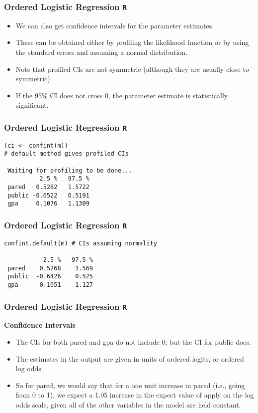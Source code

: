 \documentclass[00-GLMregslides.tex]{subfiles}
\begin{document}
	
\begin{frame}
	\frametitle{Ordered Logistic Regression \texttt{R} }
	\Large
	\begin{itemize}
\item We can also get confidence intervals for the parameter estimates. 
\item These can be obtained either by profiling the likelihood function or by using the standard errors and assuming a normal distribution.
\item Note that profiled CIs are not symmetric (although they are usually close to symmetric). 
\item If the 95\% CI does not cross 0, the parameter estimate is statistically significant.
\end{itemize}
\end{frame}
\begin{frame}[fragile]
		\frametitle{Ordered Logistic Regression \texttt{R} }
		\Large
	\begin{verbatim}
(ci <- confint(m)) 
# default method gives profiled CIs

 Waiting for profiling to be done...
          2.5 %   97.5 %
 pared   0.5282   1.5722
 public -0.6522   0.5191
 gpa     0.1076   1.1309
\end{verbatim}
\end{frame}
\begin{frame}[fragile]
\frametitle{Ordered Logistic Regression \texttt{R} }
\Large
\begin{verbatim}
confint.default(m) # CIs assuming normality

           2.5 %   97.5 %
 pared    0.5268    1.569
 public  -0.6426    0.525
 gpa      0.1051    1.127
\end{verbatim}
\end{frame}
\begin{frame}
		\frametitle{Ordered Logistic Regression \texttt{R} }
		\Large
\textbf{Confidence Intervals}
\begin{itemize}
\item The CIs for both pared and gpa do not include 0; but the CI for public does. 
\item The estimates in the output are given in units of ordered logits, or ordered log odds. 
\item So for pared, we would say that for a one unit increase in pared (i.e., going from 0 to 1), we expect a 1.05 
increase in the expect value of apply on the log odds scale, given all of the other variables in the model are held constant. 
\end{itemize}
\end{frame}
\end{document}
